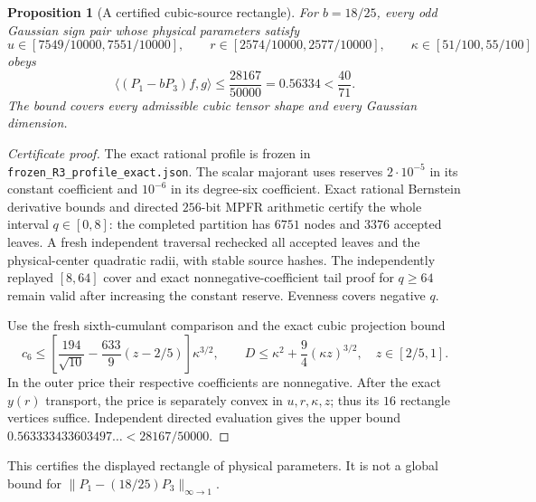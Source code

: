 \documentclass[11pt]{article}
\newtheorem{proposition}[theorem]{Proposition}
\begin{document}
\begin{proposition}[A certified cubic-source rectangle]
\label{prop:r3-certified-rectangle}
For $b=18/25$, every odd Gaussian sign pair whose physical parameters satisfy
\[
 u\in[7549/10000,7551/10000],\qquad
 r\in[2574/10000,2577/10000],\qquad
 \kappa\in[51/100,55/100]
\]
obeys
\[
 \langle(P_1-bP_3)f,g\rangle\leq\frac{28167}{50000}
 =0.56334<\frac{40}{71}.
\]
The bound covers every admissible cubic tensor shape and every Gaussian
dimension.
\end{proposition}
\begin{proof}[Certificate proof]
The exact rational profile is frozen in
\texttt{frozen\_R3\_profile\_exact.json}.  The scalar majorant uses reserves
$2\cdot10^{-5}$ in its constant coefficient and $10^{-6}$ in its
degree-six coefficient.  Exact rational Bernstein derivative bounds and
directed $256$-bit MPFR arithmetic certify the whole interval $q\in[0,8]$:
the completed partition has $6751$ nodes and $3376$ accepted leaves.
A fresh independent traversal rechecked all accepted leaves and the
physical-center quadratic radii, with stable source hashes.
The independently replayed $[8,64]$ cover and exact nonnegative-coefficient
tail proof for $q\geq64$ remain valid after increasing the constant reserve.
Evenness covers negative $q$.

Use the fresh sixth-cumulant comparison and the exact cubic projection bound
\[
 c_6\leq\left[\frac{194}{\sqrt{10}}
              -\frac{633}{9}(z-2/5)\right]\kappa^{3/2},\qquad
 D\leq\kappa^2+\frac94(\kappa z)^{3/2},\quad z\in[2/5,1].
\]
In the outer price their respective coefficients are nonnegative.
After the exact $y(r)$ transport, the price is separately convex in
$u,r,\kappa,z$; thus its $16$ rectangle vertices suffice.
Independent directed evaluation gives the upper bound
$0.563333433603497\ldots<28167/50000$.
\end{proof}
This certifies the displayed rectangle of physical parameters.  It is not
a global bound for $\|P_1-(18/25)P_3\|_{\infty\to1}$.
\end{document}
